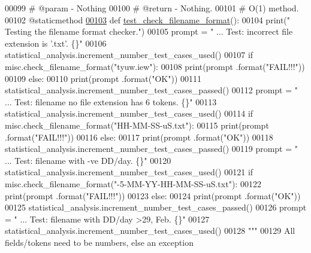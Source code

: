 \begin{DoxyCode}
00099     \textcolor{comment}{#   @param - Nothing}
00100     \textcolor{comment}{#   @return - Nothing.}
00101     \textcolor{comment}{#   O(1) method.}
00102     @staticmethod
\hypertarget{miscellaneous__tester_8py_source_l00103}{}\hyperlink{classutilities_1_1miscellaneous__tester_1_1misc__tester_a885a28d6852ecd76a814e6338ddfa0b3}{00103}     \textcolor{keyword}{def }\hyperlink{classutilities_1_1miscellaneous__tester_1_1misc__tester_a885a28d6852ecd76a814e6338ddfa0b3}{test\_check\_filename\_format}():
00104         print(\textcolor{stringliteral}{" Testing the filename format checker."})
00105         prompt = \textcolor{stringliteral}{"  ... Test: incorrect file extension is '.txt'.       \{\}"}
00106         statistical\_analysis.increment\_number\_test\_cases\_used()
00107         \textcolor{keywordflow}{if} misc.check\_filename\_format(\textcolor{stringliteral}{"tyuw.iew"}):
00108             print(prompt .format(\textcolor{stringliteral}{"FAIL!!!"}))
00109         \textcolor{keywordflow}{else}:
00110             print(prompt .format(\textcolor{stringliteral}{"OK"}))
00111             statistical\_analysis.increment\_number\_test\_cases\_passed()
00112         prompt = \textcolor{stringliteral}{"  ... Test: filename no file extension has 6 tokens.  \{\}"}
00113         statistical\_analysis.increment\_number\_test\_cases\_used()
00114         \textcolor{keywordflow}{if} misc.check\_filename\_format(\textcolor{stringliteral}{"HH-MM-SS-uS.txt"}):
00115             print(prompt .format(\textcolor{stringliteral}{"FAIL!!!"}))
00116         \textcolor{keywordflow}{else}:
00117             print(prompt .format(\textcolor{stringliteral}{"OK"}))
00118             statistical\_analysis.increment\_number\_test\_cases\_passed()
00119         prompt = \textcolor{stringliteral}{"  ... Test: filename with -ve DD/day.         \{\}"}
00120         statistical\_analysis.increment\_number\_test\_cases\_used()
00121         \textcolor{keywordflow}{if} misc.check\_filename\_format(\textcolor{stringliteral}{"-5-MM-YY-HH-MM-SS-uS.txt"}):
00122             print(prompt .format(\textcolor{stringliteral}{"FAIL!!!"}))
00123         \textcolor{keywordflow}{else}:
00124             print(prompt .format(\textcolor{stringliteral}{"OK"}))
00125             statistical\_analysis.increment\_number\_test\_cases\_passed()
00126         prompt = \textcolor{stringliteral}{"  ... Test: filename with DD/day >29, Feb.        \{\}"}
00127         statistical\_analysis.increment\_number\_test\_cases\_used()
00128         \textcolor{stringliteral}{"""}
00129 \textcolor{stringliteral}{            All fields/tokens need to be numbers, else an exception}

\end{DoxyCode}
